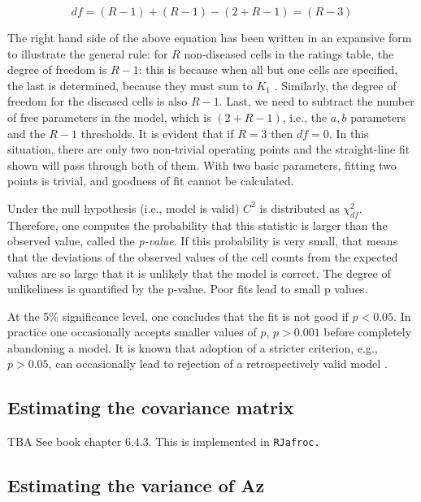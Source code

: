 \documentclass[
]{book}
\begin{document}
\begin{equation} 
df=\left ( R-1 \right )+\left ( R-1 \right )-\left (2+ R-1 \right )=\left ( R-3 \right )
\label{eq:binormal-modelGoodnessFitdf}
\end{equation}

The right hand side of the above equation has been written in an expansive form to illustrate the general rule: for \(R\) non-diseased cells in the ratings table, the degree of freedom is \(R-1\): this is because when all but one cells are specified, the last is determined, because they must sum to \(K_1\) . Similarly, the degree of freedom for the diseased cells is also \(R-1\). Last, we need to subtract the number of free parameters in the model, which is \((2+R-1)\), i.e., the \(a,b\) parameters and the \(R-1\) thresholds. It is evident that if \(R = 3\) then \(df = 0\). In this situation, there are only two non-trivial operating points and the straight-line fit shown will pass through both of them. With two basic parameters, fitting two points is trivial, and goodness of fit cannot be calculated.

Under the null hypothesis (i.e., model is valid) \(C^2\) is distributed as \(\chi_{df}^{2}\). Therefore, one computes the probability that this statistic is larger than the observed value, called the \emph{p-value}. If this probability is very small, that means that the deviations of the observed values of the cell counts from the expected values are so large that it is unlikely that the model is correct. The degree of unlikeliness is quantified by the p-value. Poor fits lead to small p values.

At the 5\% significance level, one concludes that the fit is not good if \(p < 0.05\). In practice one occasionally accepts smaller values of \(p\), \(p > 0.001\) before completely abandoning a model. It is known that adoption of a stricter criterion, e.g., \(p > 0.05\), can occasionally lead to rejection of a retrospectively valid model \citep{RN300}.

\hypertarget{estimating-the-covariance-matrix}{%
\subsection{Estimating the covariance matrix}\label{estimating-the-covariance-matrix}}

TBA See book chapter 6.4.3. This is implemented in \texttt{RJafroc.}

\hypertarget{estimating-the-variance-of-az}{%
\subsection{Estimating the variance of Az}\label{estimating-the-variance-of-az}}
\end{document}
